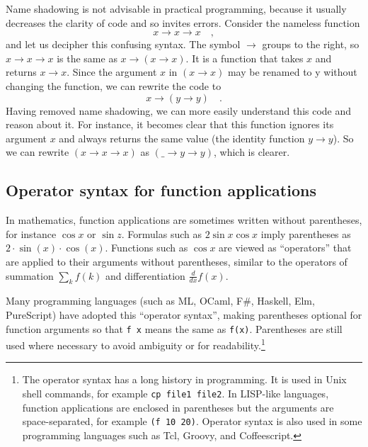 Name shadowing is not advisable in practical programming, because
it usually decreases the clarity of code and so invites errors. Consider
the nameless function
\[
x\rightarrow x\rightarrow x\quad,
\]
and let us decipher this confusing syntax. The symbol $\rightarrow$
groups to the right, so $x\rightarrow x\rightarrow x$ is the same
as $x\rightarrow\left(x\rightarrow x\right)$. It is a function that
takes $x$ and returns $x\rightarrow x$. Since the argument $x$
in $\left(x\rightarrow x\right)$ may be renamed to y without changing
the function, we can rewrite the code to
\[
x\rightarrow\left(y\rightarrow y\right)\quad.
\]
Having removed name shadowing, we can more easily understand this
code and reason about it. For instance, it becomes clear that this
function ignores its argument $x$ and always returns the same value
(the identity function $y\rightarrow y$). So we can rewrite $\left(x\rightarrow x\rightarrow x\right)$
as $\left(\_\rightarrow y\rightarrow y\right)$, which is clearer.

\subsection{Operator syntax for function applications}

In mathematics, function applications are sometimes written without
parentheses, for instance $\cos x$ or $\sin z$. Formulas such as
$2\sin x\cos x$ imply parentheses as $2\cdot\sin\left(x\right)\cdot\cos\left(x\right)$.
Functions such as $\cos x$ are viewed as ``operators'' that are
applied to their arguments without parentheses, similar to the operators
of summation $\sum_{k}f(k)$ and differentiation $\frac{d}{dx}f(x)$.

Many programming languages (such as ML, OCaml, F\#, Haskell, Elm,
PureScript) have adopted this ``operator syntax'',
making parentheses optional for function arguments so that \lstinline!f x!
means the same as \lstinline!f(x)!. Parentheses are still used where
necessary to avoid ambiguity or for readability.\footnote{The operator syntax has a long history in programming. It is used
in Unix shell commands, for example \lstinline!cp file1 file2!. In
LISP-like languages, function applications are enclosed in parentheses
but the arguments are space-separated, for example \lstinline!(f 10 20)!.
Operator syntax is also used in some programming languages such as
Tcl, Groovy, and Coffeescript.}


